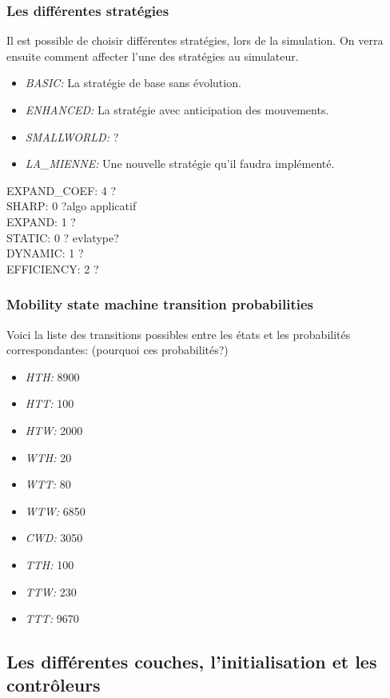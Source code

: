 \documentclass[11pt,a4paper]{article}
\begin{document}
\subsubsection{Les différentes stratégies}
\label{strat_app}
Il est possible de choisir différentes stratégies, lors de la simulation. On verra ensuite comment affecter l'une des stratégies au simulateur.
\begin{itemize}
	\renewcommand{\labelitemi}{$\bullet$}
	\item \textit{BASIC:} La stratégie de base sans évolution.
	\item \textit{ENHANCED:} La stratégie avec anticipation des mouvements.
	\item \textit{SMALLWORLD:} ?
	\item \textit{LA\_MIENNE:} Une nouvelle stratégie qu'il faudra implémenté.
\end{itemize}

EXPAND\_COEF: 4 ?\\
SHARP: 0 ?algo applicatif\\
EXPAND: 1 ?\\
STATIC: 0 ? evlatype?\\
DYNAMIC: 1 ?\\
EFFICIENCY: 2 ?\\

\subsubsection{Mobility state machine transition probabilities}
\label{prob_var}
Voici la liste des transitions possibles entre les états et les probabilités correspondantes: (pourquoi ces probabilités?)
\begin{itemize}
        \renewcommand{\labelitemi}{$\bullet$}
	\item \textit{HTH:} 8900
	\item \textit{HTT:} 100
	\item \textit{HTW:} 2000 
	\item \textit{WTH:} 20
	\item \textit{WTT:} 80
	\item \textit{WTW:} 6850
	\item \textit{CWD:} 3050
	\item \textit{TTH:} 100
	\item \textit{TTW:} 230
	\item \textit{TTT:} 9670
\end{itemize}

\subsection{Les différentes couches, l'initialisation et les contrôleurs}
\end{document}
